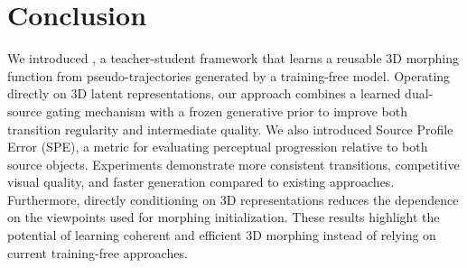 
\section{Conclusion}
\label{sec:conclusion}

We introduced \methodname{}, a teacher-student framework that learns a reusable 3D morphing function from pseudo-trajectories generated by a training-free model. Operating directly on 3D latent representations, our approach combines a learned dual-source gating mechanism with a frozen generative prior to improve both transition regularity and intermediate quality. We also introduced Source Profile Error (SPE), a metric for evaluating perceptual progression relative to both source objects. Experiments demonstrate more consistent transitions, competitive visual quality, and faster generation compared to existing approaches. Furthermore, directly conditioning on 3D representations reduces the dependence on the viewpoints used for morphing initialization. These results highlight the potential of learning coherent and efficient 3D morphing instead of relying on current training-free approaches.
